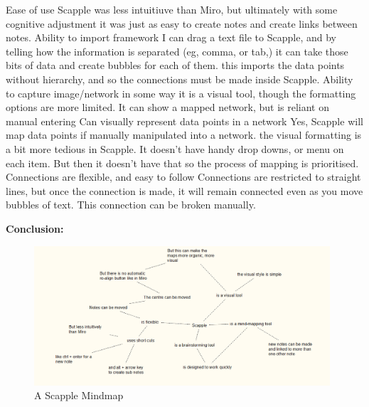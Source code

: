 \documentclass{article}
\begin{document}
\begin{outline}
    \1 Ease of use
        \2 Scapple was less intuitiuve than Miro, but ultimately with some cognitive adjustment it was just as easy to create notes and create links between notes. 
    \1 Ability to import framework
        \2 I can drag a text file to Scapple, and by telling how the information is separated (eg, comma, or tab,) it can take those bits of data and create bubbles for each of them.
        \2 this imports the data points without hierarchy, and so the connections must be made inside Scapple.
    \1 Ability to capture image/network in some way
        \2 it is a visual tool, though the formatting options are more limited. It can show a mapped network, but is reliant on manual entering
    \1 Can visually represent data points in a network
        \2 Yes, Scapple will map data points if manually manipulated into a network. 
        \2 the visual formatting is a bit more tedious in Scapple. It doesn't have handy drop downs, or menu on each item. But then it doesn't have that so the process of mapping is prioritised.
    \1 Connections are flexible, and easy to follow
        \2 Connections are restricted to straight lines, but once the connection is made, it will remain connected even as you move bubbles of text. This connection can be broken manually. 
\end{outline}

\textbf{Conclusion:}

\begin{figure}[htbp]
    \centering
    \includegraphics[width=11cm]{Images/Scapple001.PNG}
    \caption{A Scapple Mindmap}
    \label{fig: Scapple Mindmap 1}
\end{figure}
\end{document}
